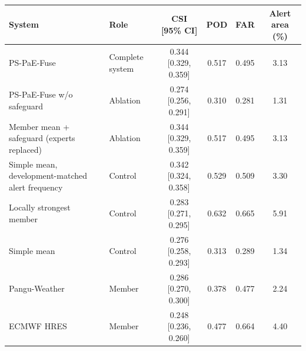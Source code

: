 \begin{tabular}{llcccc}
\hline
System & Role & CSI [95\% CI] & POD & FAR & Alert area (\%) \\
\hline
PS-PaE-Fuse & Complete system & 0.344 [0.329, 0.359] & 0.517 & 0.495 & 3.13 \\
PS-PaE-Fuse w/o safeguard & Ablation & 0.274 [0.256, 0.291] & 0.310 & 0.281 & 1.31 \\
Member mean + safeguard (experts replaced) & Ablation & 0.344 [0.329, 0.359] & 0.517 & 0.495 & 3.13 \\[5pt]
Simple mean, development-matched alert frequency & Control & 0.342 [0.324, 0.358] & 0.529 & 0.509 & 3.30 \\
Locally strongest member & Control & 0.283 [0.271, 0.295] & 0.632 & 0.665 & 5.91 \\
Simple mean & Control & 0.276 [0.258, 0.293] & 0.313 & 0.289 & 1.34 \\
Pangu-Weather & Member & 0.286 [0.270, 0.300] & 0.378 & 0.477 & 2.24 \\
ECMWF HRES & Member & 0.248 [0.236, 0.260] & 0.477 & 0.664 & 4.40 \\
\hline
\end{tabular}
